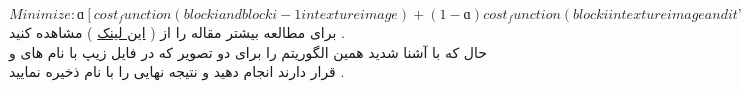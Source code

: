 \documentclass[a4paper]{article}
\begin{document}
\begin{enumerate}
	\\
	$ Minimize  : ɑ[cost_function (blocki and blocki-1 in  texture image)+(1-ɑ)cost_function(blocki in texture image and it’s correspondence in target image)]$
	برای مطالعه بیشتر مقاله را از
	 (
	\href{https://people.eecs.berkeley.edu/~efros/research/quilting/quilting.pdf}{این لینک}
	) مشاهده کنید  .
	\\
	حال که با 
	آشنا شدید همین الگوریتم را برای دو تصویر که در فایل زیپ با نام های 
	و
	قرار دارند انجام دهید و نتیجه نهایی را با نام
	ذخیره نمایید . 
	
\end{enumerate}
\end{document}
